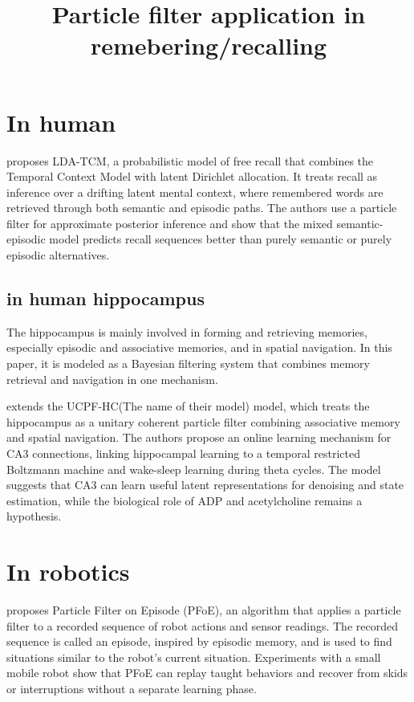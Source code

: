 \documentclass[a4paper]{article}
\title{Particle filter application in remebering/recalling}
\date{}
\begin{document}
    \maketitle
    
    
    \section{In human}
        \cite{socher-2009-a-bayesian-analysis-of-dynamics-in-free-recall} proposes LDA-TCM, a probabilistic model of free recall that combines the Temporal Context Model with latent Dirichlet allocation. It treats recall as inference over a drifting latent mental context, where remembered words are retrieved through both semantic and episodic paths. The authors use a particle filter for approximate posterior inference and show that the mixed semantic-episodic model predicts recall sequences better than purely semantic or purely episodic alternatives.
        
        \subsection{in human hippocampus}
            The hippocampus is mainly involved in forming and retrieving memories, especially episodic and associative memories, and in spatial navigation. In this paper, it is modeled as a Bayesian filtering system that combines memory retrieval and navigation in one mechanism.
            
            \cite{fox-2010-learning-in-a-unitary-coherent-hippocampus} extends the UCPF-HC(The name of their model) model, which treats the hippocampus as a unitary coherent particle filter combining associative memory and spatial navigation.
            The authors propose an online learning mechanism for CA3 connections, linking hippocampal learning to a temporal restricted Boltzmann machine and wake-sleep learning during theta cycles.
            The model suggests that CA3 can learn useful latent representations for denoising and state estimation, while the biological role of ADP and acetylcholine remains a hypothesis.
    
    
    \section{In robotics}
        \cite{ueda-2019-particle-filter-on-episode} proposes Particle Filter on Episode (PFoE), an algorithm that applies a particle filter to a recorded sequence of robot actions and sensor readings. The recorded sequence is called an episode, inspired by episodic memory, and is used to find situations similar to the robot’s current situation. Experiments with a small mobile robot show that PFoE can replay taught behaviors and recover from skids or interruptions without a separate learning phase.
        
        
        
        
        
        
        
        
        
        
        
        
        
        
\end{document}
